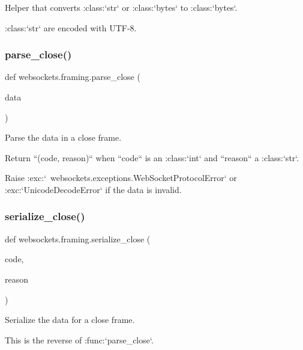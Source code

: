 \begin{DoxyVerb}Helper that converts :class:`str` or :class:`bytes` to :class:`bytes`.

:class:`str` are encoded with UTF-8.\end{DoxyVerb}
 \mbox{\label{namespacewebsockets_1_1framing_a87c07ac57ab91606a4b370928bdd9661}} 
\subsubsection{\texorpdfstring{parse\+\_\+close()}{parse\_close()}}
{\footnotesize\ttfamily def websockets.\+framing.\+parse\+\_\+close (\begin{DoxyParamCaption}\item[{}]{data }\end{DoxyParamCaption})}

\begin{DoxyVerb}Parse the data in a close frame.

Return ``(code, reason)`` when ``code`` is an :class:`int` and ``reason``
a :class:`str`.

Raise :exc:`~websockets.exceptions.WebSocketProtocolError` or
:exc:`UnicodeDecodeError` if the data is invalid.\end{DoxyVerb}
 \mbox{\label{namespacewebsockets_1_1framing_a66d055e10d1ee6fee90af85bb16bd3e0}} 
\subsubsection{\texorpdfstring{serialize\+\_\+close()}{serialize\_close()}}
{\footnotesize\ttfamily def websockets.\+framing.\+serialize\+\_\+close (\begin{DoxyParamCaption}\item[{}]{code,  }\item[{}]{reason }\end{DoxyParamCaption})}

\begin{DoxyVerb}Serialize the data for a close frame.

This is the reverse of :func:`parse_close`.\end{DoxyVerb}
 